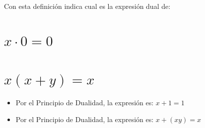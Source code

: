 \documentclass[answers]{exam}
\begin{document}
\begin{questions}
{    Con esta definición indica cual es la expresión dual de:
    \begin{parts}
      \part{$x \cdot 0 = 0$}
      \part{$x(x + y) = x$}
    \end{parts}}
  \begin{solution}
    \begin{itemize}
      \item Por el Principio de Dualidad, la expresión es: $x+1=1$
      \item Por el Principio de Dualidad, la expresión es: $x+(xy)=x$
    \end{itemize}
  \end{solution}
\end{questions}
\end{document}
